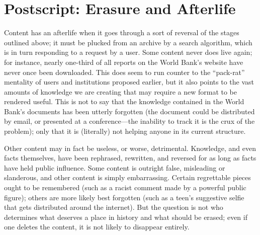 \section{Postscript: Erasure and Afterlife}

Content has an afterlife when it goes through a sort of reversal of the stages outlined above; it must be plucked from an archive by a search algorithm, which is in turn responding to a request by a user. Some content never does live again; for instance, nearly one-third of all reports on the World Bank's website have never once been downloaded.  This does seem to run counter to the ``pack-rat'' mentality of users and institutions proposed earlier, but it also points to the vast amounts of knowledge we are creating that may require a new format to be rendered useful. This is not to say that the knowledge contained in the World Bank's documents has been utterly forgotten (the document could be distributed by email, or presented at a conference—the inability to track it is the crux of the problem); only that it is (literally) not helping anyone in its current structure.

Other content may in fact be useless, or worse, detrimental. Knowledge, and even facts themselves, have been rephrased, rewritten, and reversed for as long as facts have held public influence.  Some content is outright false, misleading or slanderous, and other content is simply embarrassing. Certain regrettable pieces ought to be remembered (such as a racist comment made by a powerful public figure); others are more likely best forgotten (such as a teen's suggestive selfie that gets distributed around the internet). But the question is not who determines what deserves a place in history and what should be erased; even if one deletes the content, it is not likely to disappear entirely.

